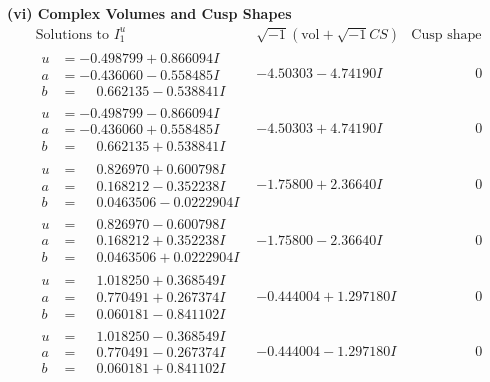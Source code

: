\documentclass[1p]{elsarticle_modified}
\theoremstyle{definition}
\newcommand{\I}{\sqrt{-1}}
\begin{document}
\newpage\flushleft \textbf{(vi) Complex Volumes and Cusp Shapes}
$$\begin{array}{c|c|c}  
\text{Solutions to }I^u_{1}& \I (\text{vol} + \sqrt{-1}CS) & \text{Cusp shape}\\
 \hline 
\begin{aligned}
u &= -0.498799 + 0.866094 I \\
a &= -0.436060 - 0.558485 I \\
b &= \phantom{-}0.662135 - 0.538841 I\end{aligned}
 & -4.50303 - 4.74190 I & \phantom{-0.000000 } 0 \\ \hline\begin{aligned}
u &= -0.498799 - 0.866094 I \\
a &= -0.436060 + 0.558485 I \\
b &= \phantom{-}0.662135 + 0.538841 I\end{aligned}
 & -4.50303 + 4.74190 I & \phantom{-0.000000 } 0 \\ \hline\begin{aligned}
u &= \phantom{-}0.826970 + 0.600798 I \\
a &= \phantom{-}0.168212 - 0.352238 I \\
b &= \phantom{-}0.0463506 - 0.0222904 I\end{aligned}
 & -1.75800 + 2.36640 I & \phantom{-0.000000 } 0 \\ \hline\begin{aligned}
u &= \phantom{-}0.826970 - 0.600798 I \\
a &= \phantom{-}0.168212 + 0.352238 I \\
b &= \phantom{-}0.0463506 + 0.0222904 I\end{aligned}
 & -1.75800 - 2.36640 I & \phantom{-0.000000 } 0 \\ \hline\begin{aligned}
u &= \phantom{-}1.018250 + 0.368549 I \\
a &= \phantom{-}0.770491 + 0.267374 I \\
b &= \phantom{-}0.060181 - 0.841102 I\end{aligned}
 & -0.444004 + 1.297180 I & \phantom{-0.000000 } 0 \\ \hline\begin{aligned}
u &= \phantom{-}1.018250 - 0.368549 I \\
a &= \phantom{-}0.770491 - 0.267374 I \\
b &= \phantom{-}0.060181 + 0.841102 I\end{aligned}
 & -0.444004 - 1.297180 I & \phantom{-0.000000 } 0 \\ \hline\begin{aligned}

\end{aligned}
\end{array}$$
\end{document}

